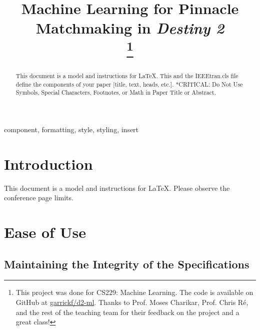 \documentclass[conference]{IEEEtran}
\begin{document}
\title{Machine Learning for Pinnacle Matchmaking in \textit{Destiny 2}\\
    \thanks{This project was done for CS229: Machine Learning.
        The code is available on GitHub at
        \href{https://github.com/garrickf/d2-ml}{garrickf/d2-ml}.
        Thanks to Prof. Moses Charikar, Prof. Chris Ré, and the rest of the teaching team for their
        feedback on the project and a great class!}
}

\author{
}

\maketitle

\begin{abstract}
    This document is a model and instructions for \LaTeX. This and the IEEEtran.cls
    file define the components of your paper [title, text, heads, etc.]. *CRITICAL: Do
    Not Use Symbols, Special Characters, Footnotes, or Math in Paper Title or
    Abstract.
\end{abstract}

\begin{IEEEkeywords}
    component, formatting, style, styling, insert
\end{IEEEkeywords}

\section{Introduction}
This document is a model and instructions for \LaTeX. Please observe the
conference page limits.

\section{Ease of Use}

\subsection{Maintaining the Integrity of the Specifications}
\end{document}
